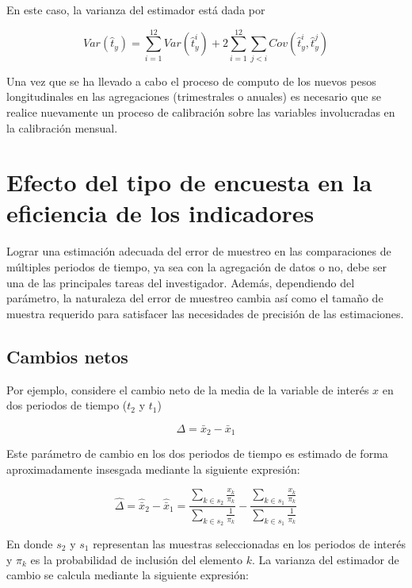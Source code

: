 En este caso, la varianza del estimador está dada por

\[
Var(\hat{t}_y) 
= \sum_{i=1}^{12} Var(\hat{t}_{y}^i)
+ 2 \sum_{i=1}^{12} \sum_{j < i} Cov(\hat{t}_{y}^i, \hat{t}_{y}^j)
\]

Una vez que se ha llevado a cabo el proceso de computo de los nuevos pesos longitudinales en las agregaciones (trimestrales o anuales) es necesario que se realice nuevamente un proceso de calibración sobre las variables involucradas en la calibración mensual.

\hypertarget{efecto-del-tipo-de-encuesta-en-la-eficiencia-de-los-indicadores}{%
\section{Efecto del tipo de encuesta en la eficiencia de los indicadores}\label{efecto-del-tipo-de-encuesta-en-la-eficiencia-de-los-indicadores}}

Lograr una estimación adecuada del error de muestreo en las comparaciones de múltiples periodos de tiempo, ya sea con la agregación de datos o no, debe ser una de las principales tareas del investigador. Además, dependiendo del parámetro, la naturaleza del error de muestreo cambia así como el tamaño de muestra requerido para satisfacer las necesidades de precisión de las estimaciones.

\hypertarget{cambios-netos}{%
\subsection*{Cambios netos}\label{cambios-netos}}


Por ejemplo, considere el cambio neto de la media de la variable de interés \(x\) en dos periodos de tiempo (\(t_2\) y \(t_1\))

\[
\Delta = \bar{x}_2 - \bar{x}_1
\]

Este parámetro de cambio en los dos periodos de tiempo es estimado de forma aproximadamente insesgada mediante la siguiente expresión:

\[
\hat{\Delta} = \hat{\bar{x}}_2 - \hat{\bar{x}}_1
= \frac{\sum_{k\in s_2}\frac{x_{k}}{\pi_k}}{\sum_{k\in s_2}\frac{1}{\pi_k}} - \frac{\sum_{k\in s_1}\frac{x_{k}}{\pi_k}}{\sum_{k\in s_1}\frac{1}{\pi_k}} 
\]

En donde \(s_2\) y \(s_1\) representan las muestras seleccionadas en los periodos de interés y \(\pi_k\) es la probabilidad de inclusión del elemento \(k\). La varianza del estimador de cambio se calcula mediante la siguiente expresión:

